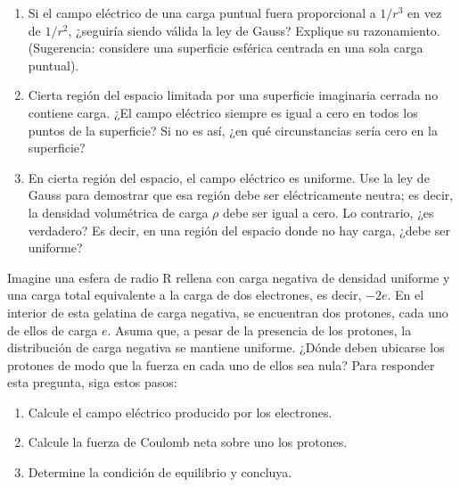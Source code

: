 \np
\begin{enumerate}[label=\alph*)]
    \item Si el campo eléctrico de una carga puntual fuera proporcional a $1/r^3$ en vez de $1/r^2$, ¿seguiría siendo válida la ley de Gauss? Explique su razonamiento. (Sugerencia: considere una superficie esférica centrada en una sola carga puntual).
    \item  Cierta región del espacio limitada por una superficie imaginaria cerrada no contiene carga. ¿El campo eléctrico siempre es igual a cero en todos los puntos de la superficie? Si no es así, ¿en qué circunstancias sería cero en la superficie?
    \item En cierta región del espacio, el campo eléctrico es uniforme. Use la ley de Gauss para demostrar que esa región debe ser eléctricamente neutra; es decir, la densidad volumétrica de carga $\rho$ debe ser igual a cero. Lo contrario, ¿es verdadero? Es decir, en una región del espacio donde no hay carga, ¿debe ser uniforme?
\end{enumerate}

\np
Imagine una esfera de radio R rellena con carga negativa de densidad uniforme y una carga total equivalente a la carga de dos electrones, es decir, $-2e$. En el interior de esta gelatina de carga negativa, se encuentran dos protones, cada uno de ellos de carga $e$. Asuma que, a pesar de la presencia de los protones, la distribución de carga negativa se mantiene uniforme. ¿Dónde deben ubicarse los protones de modo que la fuerza en cada uno de ellos sea nula? Para responder esta pregunta, siga estos pasos:
\begin{enumerate}[label=\alph*)]
    \item Calcule el campo eléctrico producido por los electrones.
    \item Calcule la fuerza de Coulomb neta sobre uno los protones.
    \item Determine la condición de equilibrio y concluya.
\end{enumerate}


\newpage